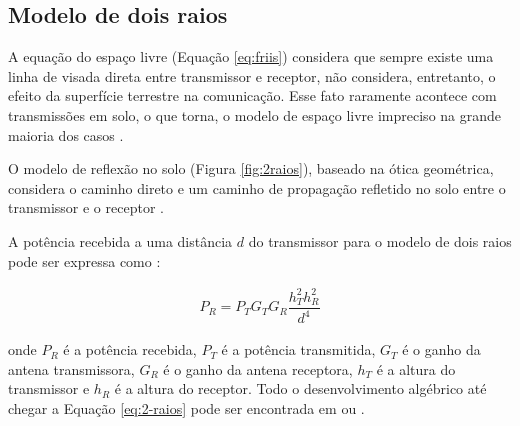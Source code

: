 \subsection{Modelo de dois raios}
\label{modelo-2-raios}

A equação do espaço livre (Equação \ref{eq:friis}) considera que sempre existe uma linha de visada direta entre transmissor e receptor, não considera, entretanto, o efeito da superfície terrestre na comunicação. Esse fato raramente acontece com transmissões em solo, o que torna, o modelo de espaço livre impreciso na grande maioria dos casos \cite{rappaport2009}.

O modelo de reflexão no solo (Figura \ref{fig:2raios}), baseado na ótica geométrica, considera o caminho direto e um caminho de propagação refletido no solo entre o transmissor e o receptor \cite{rappaport2009}.

\begin{figure}[H]
	\centering
\end{figure}

A potência recebida a uma distância $d$ do transmissor para o modelo de dois raios pode ser expressa como \cite{rappaport2009}:

\begin{equation}
	\begin{aligned}
	\label{eq:2-raios}
		P_R = P_TG_TG_R\dfrac{h^2_Th^2_R}{d^4}
	\end{aligned}
\end{equation}

\noindent onde $P_R$ é a potência recebida, $P_T$ é a potência transmitida, $G_T$ é o ganho da antena transmissora, $G_R$ é o ganho da antena receptora, $h_T$ é a altura do transmissor e $h_R$ é a altura do receptor. Todo o desenvolvimento algébrico até chegar a Equação \ref{eq:2-raios} pode ser encontrada em  ou .